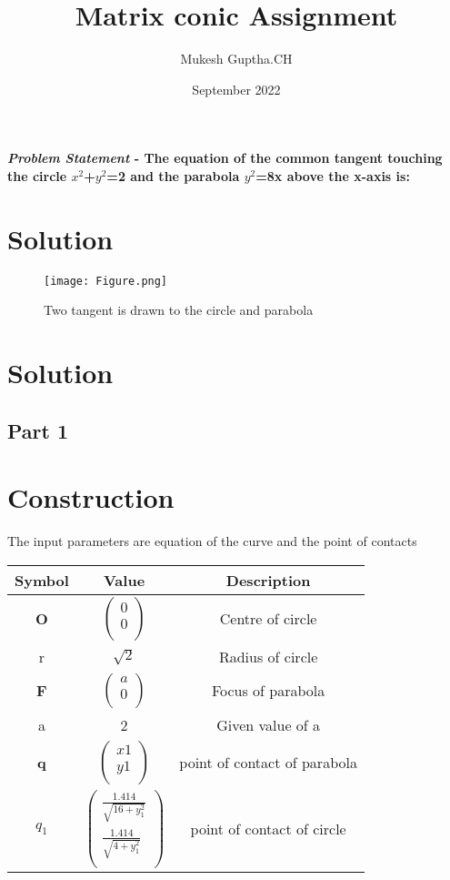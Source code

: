 \documentclass[journal,10pt,twocolumn]{article}
\title{\textbf{Matrix conic Assignment}}
\author{Mukesh Guptha.CH}
\date{September 2022}
\begin{document}
\maketitle
\paragraph{\textit{Problem Statement} - The equation of the common tangent touching the circle $x^2$+$y^2$=2 and the parabola $y^2$=8x above the x-axis is: }

\section*{Solution}
\begin{figure}[h]
\centering
\texttt{[image: Figure.png]}
\caption{Two tangent is drawn to the circle and parabola}
\label{fig:Curve}
\end{figure}
\section*{Solution}
\subsection*{Part 1}
\section*{Construction}
The input parameters are equation of the curve and the point of contacts \vspace{2mm}\\
{
\setlength\extrarowheight{2pt}
\begin{tabular}{|c|c|c|}
	\hline
	\textbf{Symbol}&\textbf{Value}&\textbf{Description}\\
	\hline
	\textbf{O}&$\begin{pmatrix}
	0\\
	0 \\
	\end{pmatrix}$&Centre of circle \\
	\hline
	r&$\sqrt{2}$&Radius of circle\\
	\hline
	\textbf{F}&$\begin{pmatrix}
	a\\
	0 \\
	\end{pmatrix}$&Focus of parabola\\
	\hline
	a&2&Given value of a\\
	\hline
	\textbf{q}&$\begin{pmatrix}
	x1 \\
	y1 \\
	\end{pmatrix}$&point of contact of parabola\\ 
	\hline
	\textbf{$q_1$}&$\begin{pmatrix}
	\frac{1.414}{\sqrt{16+y_1^2}}\\
    \frac{1.414}{\sqrt{4+y_1^2}} \\
	\end{pmatrix}$&point of contact of circle \\
	\hline
\end{tabular}
}
\end{document}
